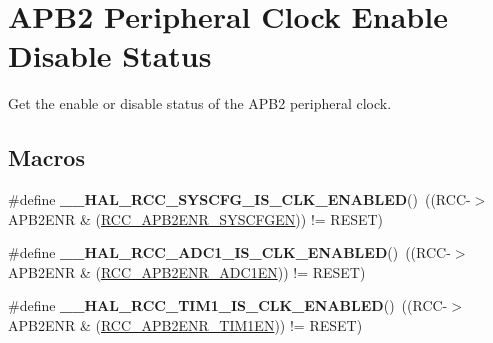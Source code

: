 \hypertarget{group___r_c_c___a_p_b2___peripheral___clock___enable___disable___status}{}\section{A\+P\+B2 Peripheral Clock Enable Disable Status}
\label{group___r_c_c___a_p_b2___peripheral___clock___enable___disable___status}


Get the enable or disable status of the A\+P\+B2 peripheral clock.  


\subsection*{Macros}
\begin{DoxyCompactItemize}
\item 
\mbox{\label{group___r_c_c___a_p_b2___peripheral___clock___enable___disable___status_gad1ea95d1d5f3a2ecf2b903c4ed22e7c6}} 
\#define {\bfseries \+\_\+\+\_\+\+H\+A\+L\+\_\+\+R\+C\+C\+\_\+\+S\+Y\+S\+C\+F\+G\+\_\+\+I\+S\+\_\+\+C\+L\+K\+\_\+\+E\+N\+A\+B\+L\+ED}()~((R\+CC-\/$>$A\+P\+B2\+E\+NR \& (\hyperlink{group___peripheral___registers___bits___definition_ga7a9d56a8aa1fa0f519ecbdf0d19dd4da}{R\+C\+C\+\_\+\+A\+P\+B2\+E\+N\+R\+\_\+\+S\+Y\+S\+C\+F\+G\+EN})) != R\+E\+S\+ET)
\item 
\mbox{\label{group___r_c_c___a_p_b2___peripheral___clock___enable___disable___status_ga66eb89f7d856d9107e814efc751e8996}} 
\#define {\bfseries \+\_\+\+\_\+\+H\+A\+L\+\_\+\+R\+C\+C\+\_\+\+A\+D\+C1\+\_\+\+I\+S\+\_\+\+C\+L\+K\+\_\+\+E\+N\+A\+B\+L\+ED}()~((R\+CC-\/$>$A\+P\+B2\+E\+NR \& (\hyperlink{group___peripheral___registers___bits___definition_ga57b9f50cb96a2e4ceba37728b4a32a42}{R\+C\+C\+\_\+\+A\+P\+B2\+E\+N\+R\+\_\+\+A\+D\+C1\+EN}))   != R\+E\+S\+ET)
\item 
\mbox{\label{group___r_c_c___a_p_b2___peripheral___clock___enable___disable___status_gad2b7c3a381d791c4ee728e303935832a}} 
\#define {\bfseries \+\_\+\+\_\+\+H\+A\+L\+\_\+\+R\+C\+C\+\_\+\+T\+I\+M1\+\_\+\+I\+S\+\_\+\+C\+L\+K\+\_\+\+E\+N\+A\+B\+L\+ED}()~((R\+CC-\/$>$A\+P\+B2\+E\+NR \& (\hyperlink{group___peripheral___registers___bits___definition_ga25852ad4ebc09edc724814de967816bc}{R\+C\+C\+\_\+\+A\+P\+B2\+E\+N\+R\+\_\+\+T\+I\+M1\+EN}))   != R\+E\+S\+ET)

\end{DoxyCompactItemize}
